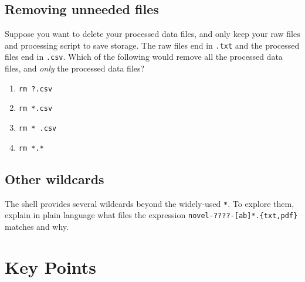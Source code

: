 \documentclass[
]{krantz}
\providecommand{\tightlist}{%
  \setlength{\itemsep}{0pt}\setlength{\parskip}{0pt}}
\begin{document}
\hypertarget{bash-basics-ex-remove-unneeded}{%
\subsection{Removing unneeded files}\label{bash-basics-ex-remove-unneeded}}

Suppose you want to delete your processed data files, and only keep
your raw files and processing script to save storage.
The raw files end in \texttt{.txt} and the processed files end in \texttt{.csv}.
Which of the following would remove all the processed data files,
and \emph{only} the processed data files?

\begin{enumerate}
\def\labelenumi{\arabic{enumi}.}
\tightlist
\item
  \texttt{rm\ ?.csv}
\item
  \texttt{rm\ *.csv}
\item
  \texttt{rm\ *\ .csv}
\item
  \texttt{rm\ *.*}
\end{enumerate}

\hypertarget{bash-basics-ex-other-wildcards}{%
\subsection{Other wildcards}\label{bash-basics-ex-other-wildcards}}

The shell provides several wildcards beyond the widely-used \texttt{*}.
To explore them,
explain in plain language what files the expression \texttt{novel-????-{[}ab{]}*.\{txt,pdf\}} matches and why.

\hypertarget{bash-basics-keypoints}{%
\section{Key Points}\label{bash-basics-keypoints}}
\end{document}
